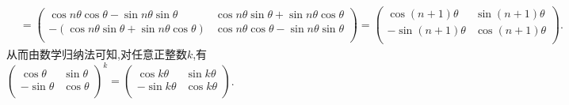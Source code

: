 \documentclass[../../main.tex]{subfiles}%
\begin{document}
\begin{solution}
\begin{align*}
&=\left( \begin{matrix}
\cos n\theta \cos \theta -\sin n\theta \sin \theta&		\cos n\theta \sin \theta +\sin n\theta \cos \theta\\
-\left( \cos n\theta \sin \theta +\sin n\theta \cos \theta \right)&		\cos n\theta \cos \theta -\sin n\theta \sin \theta\\
\end{matrix} \right) 
=\left( \begin{matrix}
\cos \left( n+1 \right) \theta&		\sin \left( n+1 \right) \theta\\
-\sin \left( n+1 \right) \theta&		\cos \left( n+1 \right) \theta\\
\end{matrix} \right) .
\end{align*}
从而由数学归纳法可知,对任意正整数\(k\),有$\left( \begin{matrix}
\cos \theta&		\sin \theta\\
-\sin \theta&		\cos \theta\\
\end{matrix} \right) ^k=\left( \begin{matrix}
\cos k\theta&		\sin k\theta\\
-\sin k\theta&		\cos k\theta\\
\end{matrix} \right)$.

\end{solution}
\end{document}
